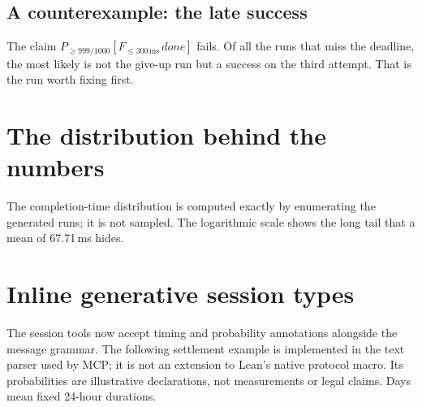 \subsection{A counterexample: the late success}

The claim $P_{\ge 999/1000}[F_{\le 300\,\mathrm{ms}}\,\mathit{done}]$ fails. Of
all the runs that miss the deadline, the most likely is not the give-up run
but a success on the third attempt. That is the run worth fixing first.

\begin{herefigure}
\caption{The most likely counterexample to the 99.9\% / 300\,ms objective:
success on the third attempt at 455\,ms, probability $9/1000$.}
\label{fig:overlay-run-late}
\end{herefigure}

\section{The distribution behind the numbers}

The completion-time distribution is computed exactly by enumerating the
generated runs; it is not sampled. The logarithmic scale shows the long tail
that a mean of 67.71\,ms hides.

\begin{herefigure}
\caption{Completion times of successful runs under the declared overlay. The
remaining $1/1000$ gives up at 615\,ms.}
\label{fig:overlay-distribution}
\end{herefigure}


\section{Inline generative session types}

The session tools now accept timing and probability annotations alongside the
message grammar. The following settlement example is implemented in the text
parser used by MCP; it is not an extension to Lean's native protocol macro.
Its probabilities are illustrative declarations, not measurements or legal
claims. Days mean fixed 24-hour durations.

